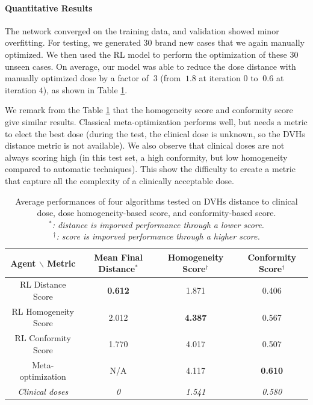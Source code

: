 \paragraph{Quantitative Results}
The network converged on the training data, and validation showed minor overfitting.
For testing, we generated 30 brand new cases that we again manually optimized.
We then used the RL model to perform the optimization of these 30 unseen cases.
On average, our model was able to reduce the dose distance with manually optimized dose by a factor of $~3$ (from $~1.8$ at iteration $0$ to $~0.6$ at iteration $4$), as shown in Table \ref{table:results}.

We remark from the Table \ref{table:results} that the homogeneity score and conformity score give similar results.
Classical meta-optimization performs well, but needs a metric to elect the best dose (during the test, the clinical dose is unknown, so the DVHs distance metric is not available).
We also observe that clinical doses are not always scoring high (in this test set, a high conformity, but low homogeneity compared to automatic techniques).
This show the difficulty to create a metric that capture all the complexity of a clinically acceptable dose.

\begin{table}
	\begin{center}
		\begin{tabular}{| c || c | c | c |} 
			\hline
			Agent $\backslash$ Metric & Mean Final Distance$^*$ & Homogeneity Score$^\dagger$ & Conformity Score$^\dagger$ \\ 
			\hline
			RL Distance Score & \textbf{0.612} & 1.871 & 0.406 \\ 
			RL Homogeneity Score & 2.012 & \textbf{4.387} & 0.567 \\
			RL Conformity Score &  1.770  & 4.017 & 0.507 \\
			Meta-optimization & N/A & 4.117 & \textbf{0.610} \\
			\textit{Clinical doses} & \textit{0} & \textit{1.541} & \textit{0.580} \\	
			\hline
		\end{tabular}
	\end{center}
	\caption{
		Average performances of four algorithms tested on DVHs distance to clinical dose, dose homogeneity-based score, and conformity-based score.\\
		\textit{$^*$: distance is imporved performance through a lower score.} \\
		\textit{$^\dagger$: score is imporved performance through a higher score.}
	}
	\label{table:results}
\end{table}

